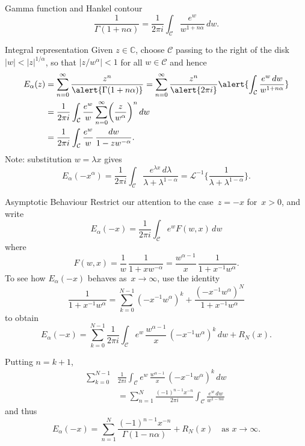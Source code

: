\documentclass{beamer}
\begin{document}
\begin{frame}{Gamma function and Hankel contour}
\[
\frac{1}{\Gamma(1+n\alpha)}=\frac{1}{2\pi i}\int_{\mathcal{C}}
    \frac{e^w}{w^{1+n\alpha}}\,dw.
\]
\vfill
\begin{center}
\end{center}
\end{frame}
\begin{frame}{Integral representation}
Given $z\in\mathbb{C}$, choose $\mathcal{C}$ passing to the right of the
disk~$|w|<|z|^{1/\alpha}$, so that $|z/w^\alpha|<1$ for all 
$w\in\mathcal{C}$ and hence
\begin{align*}
E_\alpha(z)&=\sum_{n=0}^\infty\frac{z^n}{\alert{\Gamma(1+n\alpha)}}
    =\sum_{n=0}^\infty\frac{z^n}{\alert{2\pi i}}\alert{\int_{\mathcal{C}}
	\frac{e^w\,dw}{w^{1+n\alpha}}}\\
	&=\frac{1}{2\pi i}\int_{\mathcal{C}}\frac{e^w}{w}\sum_{n=0}^\infty
	\biggl(\frac{z}{w^\alpha}\biggr)^n\,dw\\
	&=\frac{1}{2\pi i}\int_{\mathcal{C}}
	\frac{e^w}{w}\,\frac{dw}{1-zw^{-\alpha}}.
\end{align*}
Note: substitution $w=\lambda x$ gives
\[
E_\alpha(-x^\alpha)=\frac{1}{2\pi i}\int_{\mathcal{C}}
    \frac{e^{\lambda x}\,d\lambda}{\lambda+\lambda^{1-\alpha}}
    =\mathcal{L}^{-1}\biggl\{\frac{1}{\lambda+\lambda^{1-\alpha}}\biggr\}.
\]
\end{frame}
\begin{frame}{Asymptotic Behaviour}
Restrict our attention to the case~$z=-x$ for~$x>0$, and write
\[
E_\alpha(-x)=\frac{1}{2\pi i}\int_{\mathcal{C}}e^wF(w,x)\,dw 
\]
where
\[
F(w,x)=\frac{1}{w}\,\frac{1}{1+xw^{-\alpha}}
    =\frac{w^{\alpha-1}}{x}\,\frac{1}{1+x^{-1}w^\alpha}.
\]
To see how $E_\alpha(-x)$ behaves as~$x\to\infty$, use the identity
\[
\frac{1}{1+x^{-1}w^\alpha}=\sum_{k=0}^{N-1}(-x^{-1}w^\alpha)^k
    +\frac{(-x^{-1}w^\alpha)^N}{1+x^{-1}w^\alpha}
\]
to obtain
\[
E_\alpha(-x)=\sum_{k=0}^{N-1}\frac{1}{2\pi i}\int_{\mathcal{C}}
    e^w\,\frac{w^{\alpha-1}}{x}\,(-x^{-1}w^\alpha)^k\,dw+R_N(x).
\]
\end{frame}
\begin{frame}
Putting $n=k+1$,
\begin{align*}
\sum_{k=0}^{N-1}&\frac{1}{2\pi i}\int_{\mathcal{C}}
    e^w\,\frac{w^{\alpha-1}}{x}\,(-x^{-1}w^\alpha)^k\,dw\\
    &=\sum_{n=1}^N\frac{(-1)^{n-1}x^{-n}}{2\pi i}\int_{\mathcal{C}}
    \frac{e^w\,dw}{w^{1-n\alpha}}
\end{align*}    
and thus
\[
E_\alpha(-x)=\sum_{n=1}^N\frac{(-1)^{n-1}x^{-n}}{\Gamma(1-n\alpha)}+R_N(x)
\quad\text{as $x\to\infty$.}
\]
\end{frame}
\end{document}
